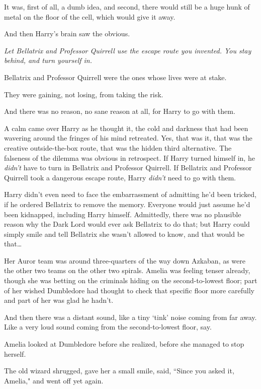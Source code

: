 It was, first of all, a dumb idea, and second, there would still be a huge hunk of metal on the floor of the cell, which would give it away.

And then Harry's brain saw the obvious.

\emph{Let Bellatrix and Professor Quirrell use the escape route you invented. You stay behind, and turn yourself in.}

Bellatrix and Professor Quirrell were the ones whose lives were at stake.

They were gaining, not losing, from taking the risk.

And there was no reason, no sane reason at all, for Harry to go with them.

A calm came over Harry as he thought it, the cold and darkness that had been wavering around the fringes of his mind retreated. Yes, that was it, that was the creative outside-the-box route, that was the hidden third alternative. The falseness of the dilemma was obvious in retrospect. If Harry turned himself in, he \emph{didn't} have to turn in Bellatrix and Professor Quirrell. If Bellatrix and Professor Quirrell took a dangerous escape route, Harry \emph{didn't} need to go with them.

Harry didn't even need to face the embarrassment of admitting he'd been tricked, if he ordered Bellatrix to remove the memory. Everyone would just assume he'd been kidnapped, including Harry himself. Admittedly, there was no plausible reason why the Dark Lord would ever ask Bellatrix to do that; but Harry could simply smile and tell Bellatrix she wasn't allowed to know, and that would be that{\ldots}

\later

Her Auror team was around three-quarters of the way down Azkaban, as were the other two teams on the other two spirals. Amelia was feeling tenser already, though she was betting on the criminals hiding on the second-to-lowest floor; part of her wished Dumbledore had thought to check that specific floor more carefully and part of her was glad he hadn't.

And then there was a distant sound, like a tiny `tink' noise coming from far away. Like a very loud sound coming from the second-to-lowest floor, say.

Amelia looked at Dumbledore before she realized, before she managed to stop herself.

The old wizard shrugged, gave her a small smile, said, ``Since you asked it, Amelia," and went off yet again.

